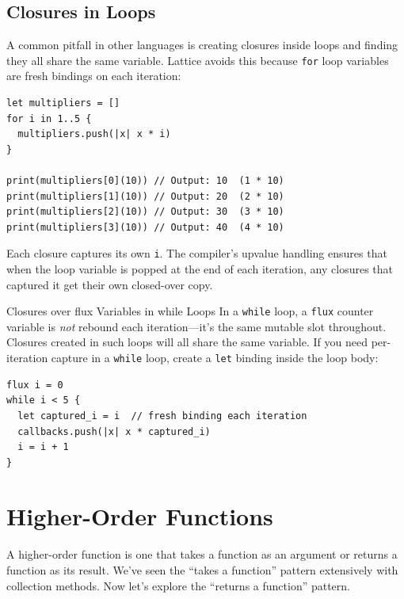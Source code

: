\subsection{Closures in Loops}\label{sec:closures-in-loops}

A common pitfall in other languages is creating closures inside loops and finding they all share the same variable. Lattice avoids this because \lstinline|for| loop variables are fresh bindings on each iteration:

\begin{lstlisting}[language=Lattice, caption={Closures in loops capture correctly}]
let multipliers = []
for i in 1..5 {
  multipliers.push(|x| x * i)
}

print(multipliers[0](10)) // Output: 10  (1 * 10)
print(multipliers[1](10)) // Output: 20  (2 * 10)
print(multipliers[2](10)) // Output: 30  (3 * 10)
print(multipliers[3](10)) // Output: 40  (4 * 10)
\end{lstlisting}

Each closure captures its own \lstinline|i|. The compiler's upvalue handling ensures that when the loop variable is popped at the end of each iteration, any closures that captured it get their own closed-over copy.

\begin{warnbox}{Closures over flux Variables in while Loops}
In a \lstinline|while| loop, a \lstinline|flux| counter variable is \emph{not} rebound each iteration---it's the same mutable slot throughout. Closures created in such loops will all share the same variable. If you need per-iteration capture in a \lstinline|while| loop, create a \lstinline|let| binding inside the loop body:
\begin{lstlisting}[language=Lattice, numbers=none]
flux i = 0
while i < 5 {
  let captured_i = i  // fresh binding each iteration
  callbacks.push(|x| x * captured_i)
  i = i + 1
}
\end{lstlisting}
\end{warnbox}

\section{Higher-Order Functions}\label{sec:higher-order}

A higher-order function is one that takes a function as an argument or returns a function as its result. We've seen the ``takes a function'' pattern extensively with collection methods. Now let's explore the ``returns a function'' pattern.

